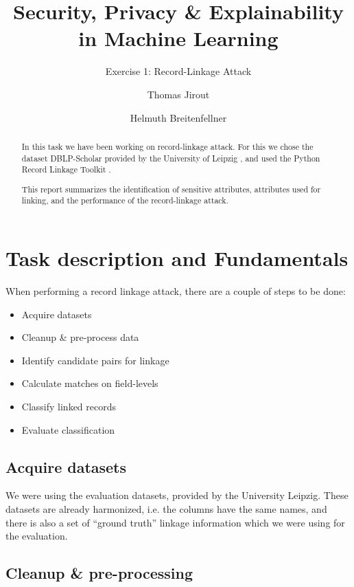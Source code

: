 \documentclass[sigconf,nonacm]{acmart}
\begin{document}
\title{Security, Privacy \& Explainability in Machine Learning}
\subtitle{Exercise 1: Record-Linkage Attack}
\author{Thomas Jirout}
\author{Helmuth Breitenfellner}
\begin{abstract}
In this task we have been working on record-linkage attack.
For this we chose the dataset DBLP-Scholar provided by the University of Leipzig \cite{DataSets},\cite{kopcke2010evaluation}
and used the Python Record Linkage Toolkit \cite{de_bruin_j_2019_3559043}.

This report summarizes the identification of sensitive attributes, attributes
used for linking, and the performance of the record-linkage attack.
\end{abstract}
\maketitle
\section{Task description and Fundamentals}

When performing a record linkage attack, there are a couple of steps
to be done:
\begin{itemize}
\item Acquire datasets
\item Cleanup \& pre-process data
\item Identify candidate pairs for linkage
\item Calculate matches on field-levels
\item Classify linked records
\item Evaluate classification
\end{itemize}

\subsection{Acquire datasets}

We were using the evaluation datasets, provided by the University Leipzig.
These datasets are already harmonized, i.e. the columns have the same names,
and there is also a set of ``ground truth'' linkage information
which we were using for the evaluation.

\subsection{Cleanup \& pre-processing}
\end{document}
